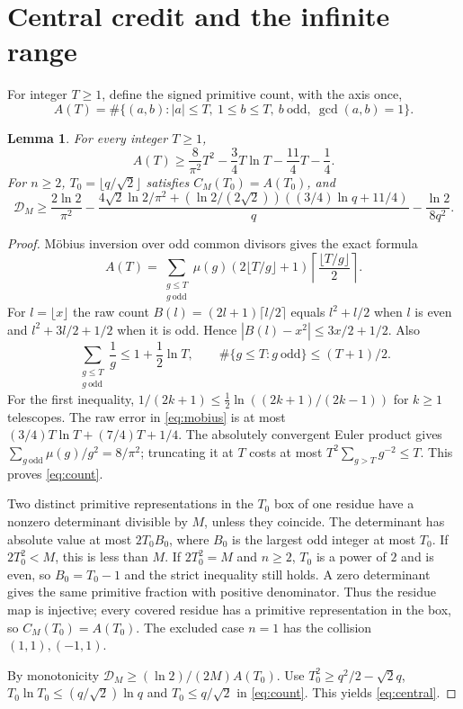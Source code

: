 \documentclass[11pt,a4paper]{article}
\numberwithin{equation}{section}
\newtheorem{lemma}[theorem]{Lemma}
\theoremstyle{remark}
\newcommand{\odd}{\mathrm{odd}}
\begin{document}
\section{Central credit and the infinite range}
For integer $T\ge1$, define the signed primitive count, with the axis once,
\[
 A(T)=\#\{(a,b):|a|\le T,\ 1\le b\le T,\ b\ \odd,\ \gcd(a,b)=1\}.
\]
\begin{lemma}\label{lem:count}
For every integer $T\ge1$,
\begin{equation}\label{eq:count}
 A(T)\ge\frac8{\pi^2}T^2-\frac34T\ln T-\frac{11}4T-\frac14.
\end{equation}
For $n\ge2$, $T_0=\lfloor q/\sqrt2\rfloor$ satisfies
$C_M(T_0)=A(T_0)$, and
\begin{equation}\label{eq:central}
 \mathcal D_M\ge\frac{2\ln2}{\pi^2}
 -\frac{4\sqrt2\ln2/\pi^2+
       (\ln2/(2\sqrt2))((3/4)\ln q+11/4)}q
 -\frac{\ln2}{8q^2}.
\end{equation}
\end{lemma}
\begin{proof}
M\"obius inversion over odd common divisors gives the exact formula
\begin{equation}\label{eq:mobius}
 A(T)=\sum_{\substack{g\le T\\g\ \odd}}
       \mu(g)(2\lfloor T/g\rfloor+1)
                   \left\lceil\frac{\lfloor T/g\rfloor}{2}\right\rceil.
\end{equation}
For $l=\lfloor x\rfloor$ the raw count
$B(l)=(2l+1)\lceil l/2\rceil$ equals $l^2+l/2$ when $l$ is even and
$l^2+3l/2+1/2$ when it is odd. Hence
$|B(l)-x^2|\le3x/2+1/2$.
Also
\[
 \sum_{\substack{g\le T\\g\ \odd}}\frac1g\le1+\frac12\ln T,
 \qquad \#\{g\le T:g\ \odd\}\le(T+1)/2.
\]
For the first inequality,
$1/(2k+1)\le\frac12\ln((2k+1)/(2k-1))$ for $k\ge1$ telescopes.
The raw error in \eqref{eq:mobius} is at most
$(3/4)T\ln T+(7/4)T+1/4$.
The absolutely convergent Euler product gives
$\sum_{g\ \odd}\mu(g)/g^2=8/\pi^2$; truncating it at $T$ costs at most
$T^2\sum_{g>T}g^{-2}\le T$.
This proves \eqref{eq:count}.

Two distinct primitive representations in the $T_0$ box of one residue
have a nonzero determinant divisible by $M$, unless they coincide.
The determinant has absolute value at most $2T_0B_0$, where $B_0$
is the largest odd integer at most $T_0$.
If $2T_0^2<M$, this is less than $M$.
If $2T_0^2=M$ and $n\ge2$, $T_0$ is a power of $2$ and is even, so
$B_0=T_0-1$ and the strict inequality still holds.
A zero determinant gives the same primitive fraction with positive
denominator. Thus the residue map is injective; every covered residue
has a primitive representation in the box, so $C_M(T_0)=A(T_0)$.
The excluded case $n=1$ has the collision $(1,1),(-1,1)$.

By monotonicity $\mathcal D_M\ge(\ln2)/(2M)A(T_0)$.
Use $T_0^2\ge q^2/2-\sqrt2q$,
$T_0\ln T_0\le(q/\sqrt2)\ln q$ and $T_0\le q/\sqrt2$ in
\eqref{eq:count}. This yields \eqref{eq:central}.
\end{proof}
\end{document}

